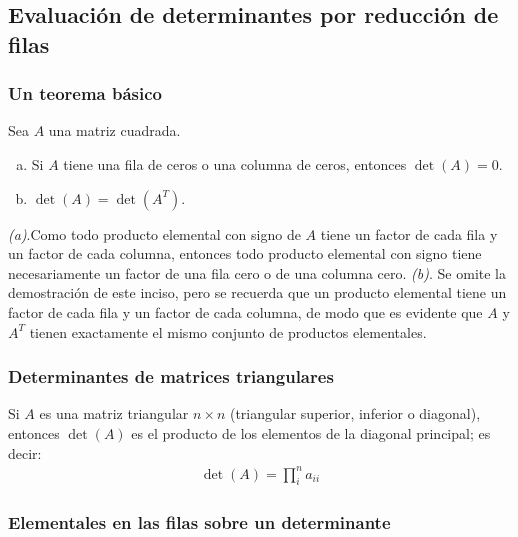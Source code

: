 \documentclass[a4paper,12pt]{article}
\begin{document}
\subsection{Evaluación de determinantes por reducción de filas}

\subsubsection{Un teorema básico}

\begin{theorem}
  Sea $A$ una matriz cuadrada.
  \begin{enumerate}[(a)]
    \item Si $A$ tiene una fila de ceros o una columna de ceros, entonces
      $\det(A)=0$.
    \item $\det(A)=\det(A^T)$.
  \end{enumerate}
  \label{theo:detbasic}
\end{theorem}

\demo \emph{(a)}.Como todo producto elemental con signo de $A$ tiene un factor de cada
fila y un factor de cada columna, entonces todo producto elemental con signo
tiene necesariamente un factor de una fila cero o de una columna cero.
\emph{(b)}. Se omite la demostración de este inciso, pero se recuerda que un
producto elemental tiene un factor de cada fila y un factor de cada columna,
de modo que es evidente que $A$ y $A^T$ tienen exactamente el mismo conjunto
de productos elementales.

\subsubsection{Determinantes de matrices triangulares}

\begin{theorem}
  Si $A$ es una matriz triangular $n\times n$ (triangular superior, inferior o
  diagonal), entonces $\det(A)$ es el producto de los elementos de la diagonal
  principal; es decir:
  \begin{align*}
    \det(A)=\prod_i^n a_{ii}
  \end{align*}
  \label{theo:triangdet}
\end{theorem}

\subsubsection{Elementales en las filas sobre un determinante}
\end{document}

